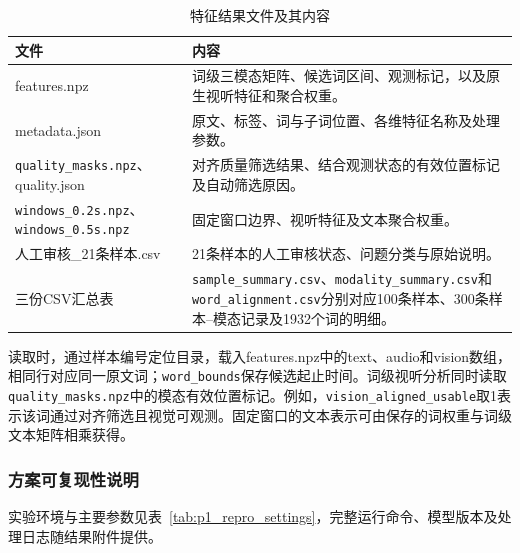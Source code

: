 \begin{table}[H]
    \centering\small
    \caption{特征结果文件及其内容}
    \label{tab:p1_files}
    \setlength{\tabcolsep}{6pt}
    \renewcommand{\arraystretch}{1.12}
    \ifdefined\pOneCompactTableBox\else\newsavebox{\pOneCompactTableBox}\fi
    \begin{lrbox}{\pOneCompactTableBox}
    \begin{tabular}{l>{\raggedright\arraybackslash}p{24em}}
        \toprule
        文件 & 内容\\
        \midrule
        features.npz & 词级三模态矩阵、候选词区间、观测标记，以及原生视听特征和聚合权重。\\
        metadata.json & 原文、标签、词与子词位置、各维特征名称及处理参数。\\
        \nolinkurl{quality_masks.npz}、\newline quality.json & 对齐质量筛选结果、结合观测状态的有效位置标记及自动筛选原因。\\
        \nolinkurl{windows_0.2s.npz}、\newline\nolinkurl{windows_0.5s.npz} & 固定窗口边界、视听特征及文本聚合权重。\\
        人工审核\_21条样本.csv & 21条样本的人工审核状态、问题分类与原始说明。\\
        三份CSV汇总表 & \nolinkurl{sample_summary.csv}、\nolinkurl{modality_summary.csv}和\nolinkurl{word_alignment.csv}分别对应100条样本、300条样本--模态记录及1932个词的明细。\\
        \bottomrule
    \end{tabular}
    \end{lrbox}
    \usebox{\pOneCompactTableBox}
\end{table}

读取时，通过样本编号定位目录，载入features.npz中的text、audio和vision数组，相同行对应同一原文词；\nolinkurl{word_bounds}保存候选起止时间。词级视听分析同时读取\nolinkurl{quality_masks.npz}中的模态有效位置标记。例如，\nolinkurl{vision_aligned_usable}取1表示该词通过对齐筛选且视觉可观测。固定窗口的文本表示可由保存的词权重与词级文本矩阵相乘获得。

\subsubsection{方案可复现性说明}
\label{sec:p1_reproducibility}

实验环境与主要参数见表~\ref{tab:p1_repro_settings}，完整运行命令、模型版本及处理日志随结果附件提供。


